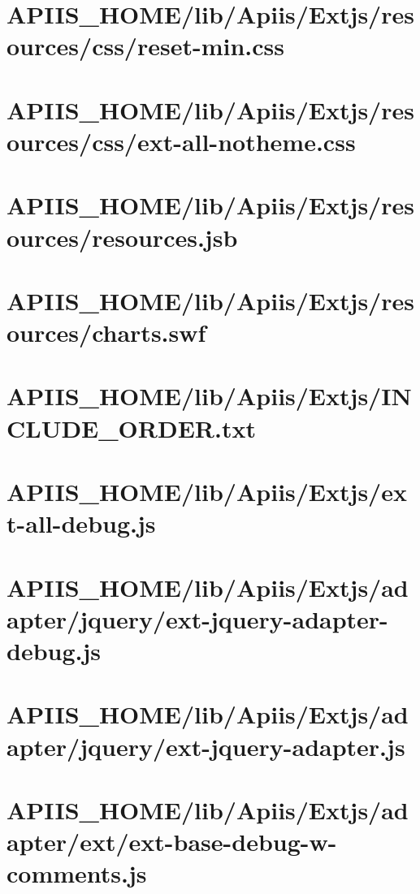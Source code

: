 \section{APIIS\_HOME/lib/Apiis/Extjs/resources/css/reset-min.css} 
\section{APIIS\_HOME/lib/Apiis/Extjs/resources/css/ext-all-notheme.css} 
\section{APIIS\_HOME/lib/Apiis/Extjs/resources/resources.jsb} 
\section{APIIS\_HOME/lib/Apiis/Extjs/resources/charts.swf} 
\section{APIIS\_HOME/lib/Apiis/Extjs/INCLUDE\_ORDER.txt} 
\section{APIIS\_HOME/lib/Apiis/Extjs/ext-all-debug.js} 
\section{APIIS\_HOME/lib/Apiis/Extjs/adapter/jquery/ext-jquery-adapter-debug.js} 
\section{APIIS\_HOME/lib/Apiis/Extjs/adapter/jquery/ext-jquery-adapter.js} 
\section{APIIS\_HOME/lib/Apiis/Extjs/adapter/ext/ext-base-debug-w-comments.js} 

